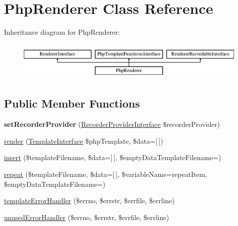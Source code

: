 \hypertarget{class_pes_1_1_view_1_1_renderer_1_1_php_renderer}{}\section{Php\+Renderer Class Reference}
\label{class_pes_1_1_view_1_1_renderer_1_1_php_renderer}
Inheritance diagram for Php\+Renderer\+:\begin{figure}[H]
\begin{center}
\leavevmode
\includegraphics[height=1.895093cm]{class_pes_1_1_view_1_1_renderer_1_1_php_renderer}
\end{center}
\end{figure}
\subsection*{Public Member Functions}
\begin{DoxyCompactItemize}
\item 
\mbox{\label{class_pes_1_1_view_1_1_renderer_1_1_php_renderer_a8fd12d6021bfe986b2f45230378d6bc2}} 
{\bfseries set\+Recorder\+Provider} (\mbox{\hyperlink{interface_pes_1_1_view_1_1_recorder_1_1_recorder_provider_interface}{Recorder\+Provider\+Interface}} \$recorder\+Provider)
\item 
\mbox{\hyperlink{class_pes_1_1_view_1_1_renderer_1_1_php_renderer_a6d2fb528237476a2ce3467dd12f0448a}{render}} (\mbox{\hyperlink{interface_pes_1_1_view_1_1_template_1_1_template_interface}{Template\+Interface}} \$php\+Template, \$data=\mbox{[}$\,$\mbox{]})
\item 
\mbox{\hyperlink{class_pes_1_1_view_1_1_renderer_1_1_php_renderer_ae62d97adedce8c34fa312e0f63b1df26}{insert}} (\$template\+Filename, \$data=\mbox{[}$\,$\mbox{]}, \$empty\+Data\+Template\+Filename=\textquotesingle{}\textquotesingle{})
\item 
\mbox{\hyperlink{class_pes_1_1_view_1_1_renderer_1_1_php_renderer_a59c2c3bcc551a9d1ccf3b49224c985e3}{repeat}} (\$template\+Filename, \$data=\mbox{[}$\,$\mbox{]}, \$variable\+Name=\textquotesingle{}repeat\+Item\textquotesingle{}, \$empty\+Data\+Template\+Filename=\textquotesingle{}\textquotesingle{})
\item 
\mbox{\hyperlink{class_pes_1_1_view_1_1_renderer_1_1_php_renderer_ab4e48eb95d4123201adba472b9f03a20}{template\+Error\+Handler}} (\$errno, \$errstr, \$errfile, \$errline)
\item 
\mbox{\hyperlink{class_pes_1_1_view_1_1_renderer_1_1_php_renderer_abdba8d6534d8d1f948daeb4d985ef878}{unused\+Error\+Handler}} (\$errno, \$errstr, \$errfile, \$errline)
\end{DoxyCompactItemize}
